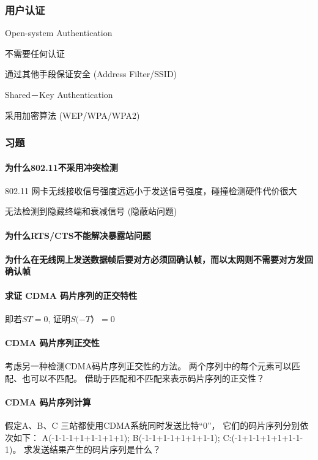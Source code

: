 \documentclass[UTF8,cs4size]{ctexart}
\begin{document}
\subsubsection{用户认证}
Open-system Authentication
\begin{compactitem}
  \item 不需要任何认证
  \item 通过其他手段保证安全 (Address Filter/SSID)
\end{compactitem}

Shared－Key Authentication
\begin{compactitem}
  \item 采用加密算法 (WEP/WPA/WPA2)
\end{compactitem}
\subsubsection{习题}
\paragraph{为什么802.11不采用冲突检测}
\begin{compactitem}
  \item 802.11 网卡无线接收信号强度远远小于发送信号强度，碰撞检测硬件代价很大
  \item 无法检测到隐藏终端和衰减信号 (隐蔽站问题)
\end{compactitem}
\paragraph{为什么RTS/CTS不能解决暴露站问题}
\paragraph{为什么在无线网上发送数据帧后要对方必须回确认帧，而以太网则不需要对方发回确认帧}
\paragraph{求证 CDMA 码片序列的正交特性}
即若$ST=0$, 证明$S(-T）=0$
\paragraph{CDMA 码片序列正交性}
考虑另一种检测CDMA码片序列正交性的方法。
两个序列中的每个元素可以匹配、也可以不匹配。
借助于匹配和不匹配来表示码片序列的正交性？
\paragraph{CDMA 码片序列计算}
假定A、B、C 三站都使用CDMA系统同时发送比特“0”，
它们的码片序列分别依次如下：
A(-1-1-1+1+1-1+1+1);
B(-1-1+1-1+1+1+1-1);
C:(-1+1-1+1+1+1-1-1)。
求发送结果产生的码片序列是什么？
\clearpage
\end{document}
